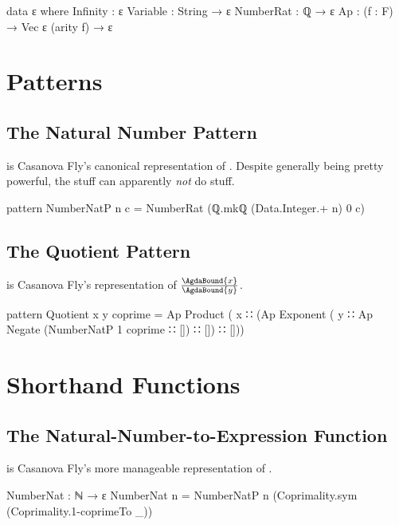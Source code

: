 \documentclass{report}
\begin{document}
\begin{code}
  data ε where
    Infinity : ε
    Variable : String → ε
    NumberRat : ℚ → ε
    Ap : (f : F) → Vec ε (arity f) → ε
\end{code}

\section{Patterns}

\subsection{The Natural Number Pattern}
   is Casanova Fly's canonical representation of .  Despite generally being pretty powerful, the  stuff can apparently \emph{not} do  stuff.

\begin{code}
  pattern NumberNatP n c = NumberRat (ℚ.mkℚ (Data.Integer.+ n) 0 c)
\end{code}

\subsection{The Quotient Pattern}
    is Casanova Fly's representation of \(\frac{\AgdaBound{x}}{\AgdaBound{y}}\).

\begin{code}
  pattern Quotient x y coprime =
    Ap Product
       ( x
       ∷ (Ap Exponent
             ( y
             ∷ Ap Negate (NumberNatP 1 coprime ∷ [])
             ∷ [])
       ∷ []))
\end{code}

\section{Shorthand Functions}

\subsection{The Natural-Number-to-Expression Function}
  is Casanova Fly's more manageable representation of .

\begin{code}
  NumberNat : ℕ → ε
  NumberNat n = NumberNatP n (Coprimality.sym (Coprimality.1-coprimeTo _))
\end{code}
\end{document}
